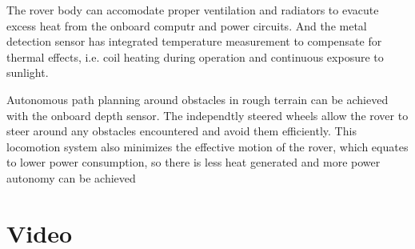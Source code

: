 The rover body can accomodate proper ventilation and radiators to evacute excess heat from the onboard computr and power circuits.
And the metal detection sensor has integrated temperature measurement to compensate for thermal effects, i.e. coil heating during operation and continuous exposure to sunlight.

Autonomous path planning around obstacles in rough terrain can be achieved with the onboard depth sensor.
The independtly steered wheels allow the rover to steer around any obstacles encountered and avoid them efficiently.
This locomotion system also minimizes the effective motion of the rover, which equates to lower power consumption, so there is less heat generated and more power autonomy can be achieved

\section{Video}

